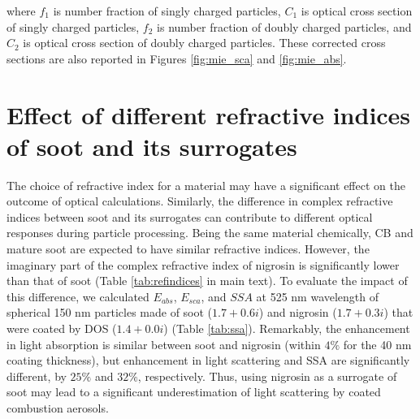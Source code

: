 \documentclass[12pt]{article}
\begin{document}
\noindent where $f_1$ is number fraction of singly charged particles, $C_1$ is optical cross section of singly charged particles, $f_2$ is number fraction of doubly charged particles, and $C_2$ is optical cross section of doubly charged particles. These corrected cross sections are also reported in Figures \ref{fig:mie_sca} and \ref{fig:mie_abs}.




\section{Effect of different refractive indices of soot and its surrogates}

The choice of refractive index for a material may have a significant effect on the outcome of optical calculations. Similarly, the difference in complex refractive indices between soot and its surrogates can contribute to different optical responses during particle processing. Being the same material chemically, CB and mature soot are expected to have similar refractive indices. However, the imaginary part of the complex refractive index of nigrosin is significantly lower than that of soot (Table \ref{tab:refindices} in main text). To evaluate the impact of this difference, we calculated $E_{abs}$, $E_{sca}$, and $SSA$ at 525 nm wavelength of spherical 150 nm particles made of soot ($1.7+0.6i$) and nigrosin ($1.7+0.3i$) that were coated by DOS ($1.4+0.0i$) (Table \ref{tab:ssa}). Remarkably, the enhancement in light absorption is similar between soot and nigrosin (within $4\%$ for the 40 nm coating thickness), but enhancement in light scattering and SSA are significantly different, by $25\%$ and $32\%$, respectively. Thus, using nigrosin as a surrogate of soot may lead to a significant underestimation of light scattering by coated combustion aerosols.



\end{document}
